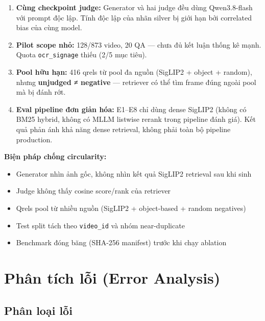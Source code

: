 \documentclass[12pt,a4paper,onecolumn]{article}
\begin{document}
\begin{enumerate}
  \item \textbf{Cùng checkpoint judge:} Generator và hai judge đều dùng Qwen3.8-flash với prompt độc lập. Tính độc lập của nhãn silver bị giới hạn bởi correlated bias của cùng model.
  \item \textbf{Pilot scope nhỏ:} 128/873 video, 20 QA — chưa đủ kết luận thống kê mạnh. Quota \texttt{ocr\_signage} thiếu (2/5 mục tiêu).
  \item \textbf{Pool hữu hạn:} 416 qrels từ pool đa nguồn (SigLIP2 + object + random), nhưng \textbf{unjudged ≠ negative} — retriever có thể tìm frame đúng ngoài pool mà bị đánh rớt.
  \item \textbf{Eval pipeline đơn giản hóa:} E1–E8 chỉ dùng dense SigLIP2 (không có BM25 hybrid, không có MLLM listwise rerank trong pipeline đánh giá). Kết quả phản ánh khả năng dense retrieval, không phải toàn bộ pipeline production.
\end{enumerate}


\textbf{Biện pháp chống circularity:}

\begin{itemize}
  \item Generator nhìn ảnh gốc, không nhìn kết quả SigLIP2 retrieval sau khi sinh
  \item Judge không thấy cosine score/rank của retriever
  \item Qrels pool từ nhiều nguồn (SigLIP2 + object-based + random negatives)
  \item Test split tách theo \texttt{video\_id} và nhóm near-duplicate
  \item Benchmark đóng băng (SHA-256 manifest) trước khi chạy ablation
\end{itemize}


\section{Phân tích lỗi (Error Analysis)}

\subsection{Phân loại lỗi}
\end{document}
